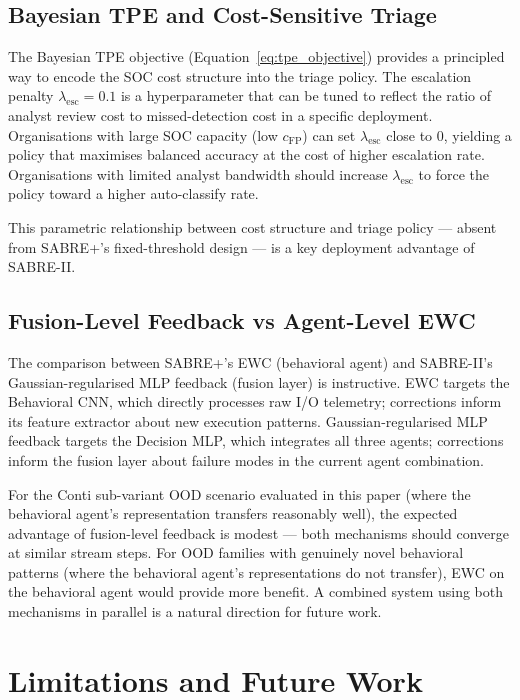 \documentclass[journal]{IEEEtran}
\begin{document}
\subsection{Bayesian TPE and Cost-Sensitive Triage}

The Bayesian TPE objective (Equation~\eqref{eq:tpe_objective}) provides
a principled way to encode the SOC cost structure into the triage policy.
The escalation penalty $\lambda_{\mathrm{esc}} = 0.1$ is a hyperparameter
that can be tuned to reflect the ratio of analyst review cost to
missed-detection cost in a specific deployment.
Organisations with large SOC capacity (low $c_{\mathrm{FP}}$) can set
$\lambda_{\mathrm{esc}}$ close to 0, yielding a policy that maximises
balanced accuracy at the cost of higher escalation rate.
Organisations with limited analyst bandwidth should increase
$\lambda_{\mathrm{esc}}$ to force the policy toward a higher
auto-classify rate.

This parametric relationship between cost structure and triage policy
--- absent from SABRE+'s fixed-threshold design --- is a key deployment
advantage of SABRE-II.

\subsection{Fusion-Level Feedback vs Agent-Level EWC}

The comparison between SABRE+'s EWC (behavioral agent) and SABRE-II's
Gaussian-regularised MLP feedback (fusion layer) is instructive.
EWC targets the Behavioral CNN, which directly processes raw I/O telemetry;
corrections inform its feature extractor about new execution patterns.
Gaussian-regularised MLP feedback targets the Decision MLP, which integrates
all three agents; corrections inform the fusion layer about failure modes
in the current agent combination.

For the Conti sub-variant OOD scenario evaluated in this paper
(where the behavioral agent's representation transfers reasonably well),
the expected advantage of fusion-level feedback is modest --- both
mechanisms should converge at similar stream steps.
For OOD families with genuinely novel behavioral patterns (where the
behavioral agent's representations do not transfer), EWC on the
behavioral agent would provide more benefit.
A combined system using both mechanisms in parallel is a natural
direction for future work.


\section{Limitations and Future Work}
\label{sec:limitations}
\end{document}
